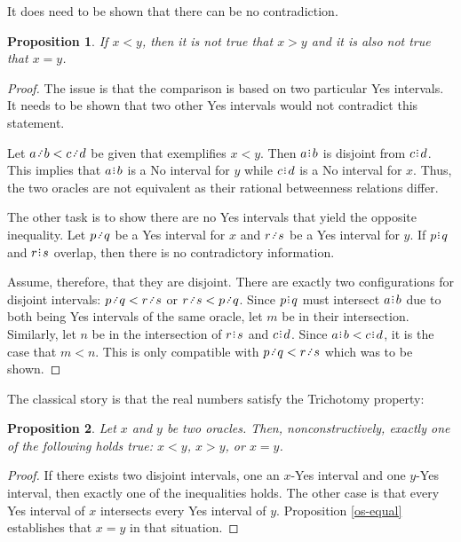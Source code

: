 \documentclass[12pt]{article}
\newtheorem{proposition}{Proposition}[section]
\begin{document}
It does need to be shown that there can be no contradiction. 

\begin{proposition}
    If $x < y$, then it is not true that $x > y$ and it is also not true that $x = y$.
\end{proposition}

\begin{proof}
    The issue is that the comparison is based on two particular Yes intervals. It needs to be shown that two other Yes intervals would not contradict this statement. 

    Let $a\lte b < c\lte d$ be given that exemplifies $x<y$. Then $a\rint b$ is disjoint from $c\rint d$. This implies that $a\rint b$ is a No interval for $y$ while $c\rint d$ is a No interval for $x$. Thus, the two oracles are not equivalent as their rational betweenness relations differ.

    The other task is to show there are no Yes intervals that yield the opposite inequality. Let $p\lte q$ be a Yes interval for $x$ and $r \lte s$ be a Yes interval for $y$. If $p\rint q$ and $r\rint s$ overlap, then there is no contradictory information. 

    Assume, therefore, that they are disjoint. There are exactly two configurations for disjoint intervals:  $p \lte q < r \lte s$ or $ r \lte s < p \lte q$. Since $p\rint q$ must intersect $a\rint b$ due to both being Yes intervals of the same oracle, let $m$ be in their intersection. Similarly, let $n$ be in the intersection of $r\rint s$ and $c\rint d$. Since $a\rint b < c\rint d$, it is the case that $m < n$. This is only compatible with $p \lte q < r \lte s$ which was to be shown. 

\end{proof}



The classical story is that the real numbers satisfy the Trichotomy property: 
 



\begin{proposition}
    Let $x$ and $y$ be two oracles. Then, nonconstructively, exactly one of the following holds true:  $x<y$, $x>y$, or $x=y$.
\end{proposition}

\begin{proof}
    If there exists two disjoint intervals, one an $x$-Yes interval and one $y$-Yes interval, then exactly one of the inequalities holds. The other case is that every Yes interval of $x$ intersects every Yes interval of $y$. Proposition \ref{os-equal} establishes that $x=y$ in that situation. 
\end{proof}
\end{document}
